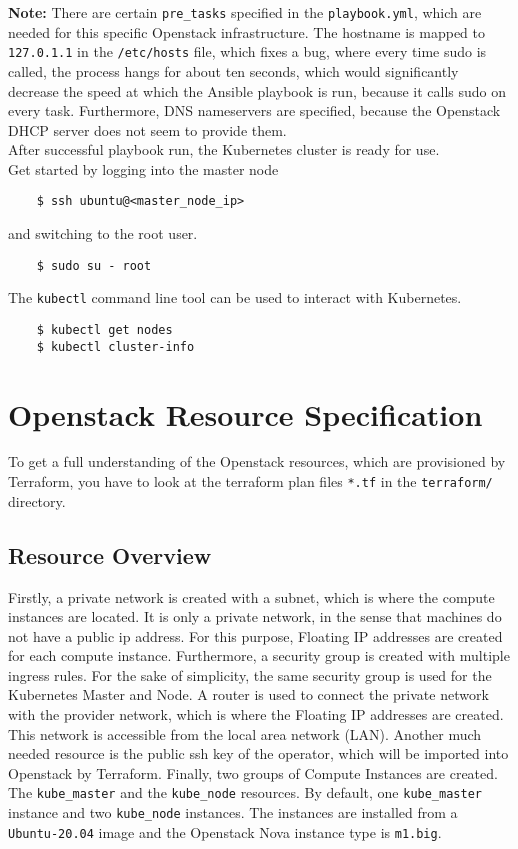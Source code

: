 \noindent
\textbf{Note:} There are certain \verb|pre_tasks| specified in the
\verb|playbook.yml|, which are needed for this specific 
Openstack infrastructure. The hostname is mapped to \verb|127.0.1.1| 
in the \verb|/etc/hosts| file, which fixes a bug, where
every time sudo is called, the process hangs for about ten seconds,
which would significantly decrease the speed at which the 
Ansible playbook is run, because it calls sudo on every task. 
Furthermore, DNS nameservers are specified, because the Openstack DHCP server
does not seem to provide them. \\

\noindent
After successful playbook run, the Kubernetes cluster is ready for use. \\

\noindent
Get started by logging into the master node

\begin{verbatim}
	$ ssh ubuntu@<master_node_ip>
\end{verbatim}

\noindent
and switching to the root user.

\begin{verbatim}
	$ sudo su - root
\end{verbatim}

\noindent
The \verb|kubectl| command line tool can be used to interact with Kubernetes.

\begin{verbatim}
	$ kubectl get nodes
	$ kubectl cluster-info
\end{verbatim}

\section{Openstack Resource Specification}
To get a full understanding of the Openstack resources, 
which are provisioned by Terraform,
you have to look at the terraform plan files \verb|*.tf| in the
\verb|terraform/| directory.

\subsection{Resource Overview}
Firstly, a private network is created with a subnet,
which is where the compute instances are located. It is only a private network,
in the sense that machines do not have a public ip address. For this purpose,
Floating IP addresses are created for each compute instance. Furthermore,
a security group is created with multiple ingress rules. For the sake of 
simplicity, the same security group is used for the Kubernetes Master and Node.
A router is used to connect the private network with the provider network,
which is where the Floating IP addresses are created. 
This network is accessible from the local area network (LAN). 
Another much needed resource is the public ssh key of the operator,
which will be imported into Openstack by Terraform. 
Finally, two groups of Compute Instances are created. 
The \verb|kube_master| and the \verb|kube_node| resources.
By default, one \verb|kube_master| instance and two \verb|kube_node| instances.
The instances are installed from a \verb|Ubuntu-20.04| image and the 
Openstack Nova instance type is \verb|m1.big|.

